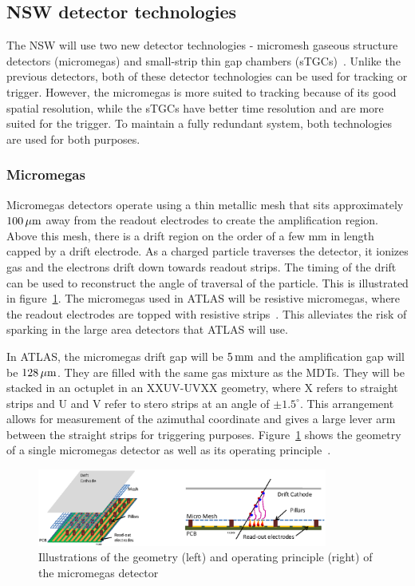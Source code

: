 \subsection{NSW detector technologies}

The NSW will use two new detector technologies - micromesh gaseous structure detectors (micromegas) and small-strip thin gap chambers (sTGCs)~\cite{MMPaper,NSW_TDR}. Unlike the previous detectors, both of these detector technologies can be used for tracking or trigger. However, the micromegas is more suited to tracking because of its good spatial resolution, while the sTGCs have better time resolution and are more suited for the trigger. To maintain a fully redundant system, both technologies are used for both purposes. 

\subsubsection{Micromegas}

Micromegas detectors operate using a thin metallic mesh that sits approximately $100\,\mu \rm m$ away from the readout electrodes to create the amplification region. Above this mesh, there is a drift region on the order of a few mm in length capped by a drift electrode. As a charged particle traverses the detector, it ionizes gas and the electrons drift down towards readout strips. The timing of the drift can be used to reconstruct the angle of traversal of the particle. This is illustrated in figure~\ref{fig:mm}. The micromegas used in ATLAS will be resistive micromegas, where the readout electrodes are topped with resistive strips~\cite{ResistiveMM}. This alleviates the risk of sparking in the large area detectors that ATLAS will use.

In ATLAS, the micromegas drift gap will be $5\,\rm mm$ and the amplification gap will be $128\,\mu \rm m$. They are filled with the same gas mixture as the MDTs. They will be stacked in an octuplet in an XXUV-UVXX geometry, where X refers to straight strips and U and V refer to stero strips at an angle of $\pm 1.5^\circ$. This arrangement allows for measurement of the azimuthal coordinate and gives a large lever arm between the straight strips for triggering purposes. Figure~\ref{fig:mm} shows the geometry of a single micromegas detector as well as its operating principle~\cite{NSW_TDR}. 

\begin{figure}[h!]
  \centering
  \captionsetup{justification=centering}

  \includegraphics[width=0.85\textwidth]{figures/MM}
   \caption{Illustrations of the geometry (left) and operating principle (right) of the micromegas detector~\cite{NSW_TDR}}
  \label{fig:mm}
\end{figure}

